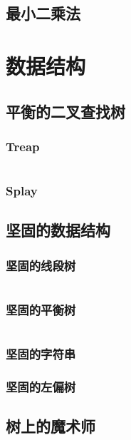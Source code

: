 \documentclass[a4paper]{article}
\newcommand{\cppcode}[1]{
    \inputminted[mathescape]{cpp}{source/#1}
}
\begin{document}
\subsection{最小二乘法}

\section{数据结构}

\subsection{平衡的二叉查找树}

\subsubsection{Treap}

\cppcode{data-structure/treap.cpp}

\subsubsection{Splay}

\subsection{坚固的数据结构}

\subsubsection{坚固的线段树}

\cppcode{data-structure/persistent-segment-tree.cpp}

\subsubsection{坚固的平衡树}

\cppcode{data-structure/persistent-treap.cpp}

\subsubsection{坚固的字符串}

\subsubsection{坚固的左偏树}

\subsection{树上的魔术师}
\end{document}

